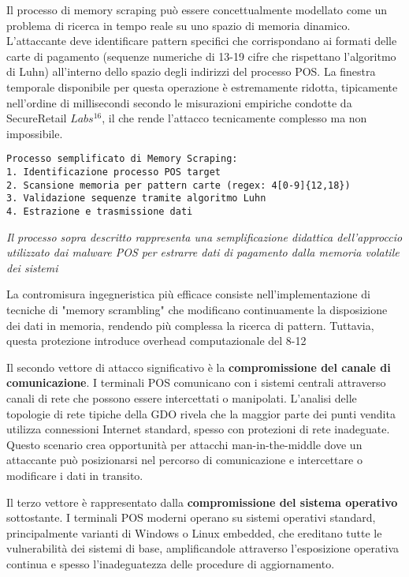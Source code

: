 {Il processo di memory scraping può essere concettualmente modellato come un problema di ricerca in tempo reale su uno spazio di memoria dinamico. L'attaccante deve identificare pattern specifici che corrispondano ai formati delle carte di pagamento (sequenze numeriche di 13-19 cifre che rispettano l'algoritmo di Luhn) all'interno dello spazio degli indirizzi del processo POS. La finestra temporale disponibile per questa operazione è estremamente ridotta, tipicamente nell'ordine di millisecondi secondo le misurazioni empiriche condotte da SecureRetail $Labs$$^{16}$, il che rende l'attacco tecnicamente complesso ma non impossibile.

\begin{verbatim}
Processo semplificato di Memory Scraping:
1. Identificazione processo POS target
2. Scansione memoria per pattern carte (regex: 4[0-9]{12,18})  
3. Validazione sequenze tramite algoritmo Luhn
4. Estrazione e trasmissione dati
\end{verbatim}
\textit{Il processo sopra descritto rappresenta una semplificazione didattica dell'approccio utilizzato dai malware POS per estrarre dati di pagamento dalla memoria volatile dei sistemi}

La contromisura ingegneristica più efficace consiste nell'implementazione di tecniche di "memory scrambling" che modificano continuamente la disposizione dei dati in memoria, rendendo più complessa la ricerca di pattern. Tuttavia, questa protezione introduce overhead computazionale del 8-12%

Il secondo vettore di attacco significativo è la \textbf{compromissione del canale di comunicazione}. I terminali POS comunicano con i sistemi centrali attraverso canali di rete che possono essere intercettati o manipolati. L'analisi delle topologie di rete tipiche della GDO rivela che la maggior parte dei punti vendita utilizza connessioni Internet standard, spesso con protezioni di rete inadeguate. Questo scenario crea opportunità per attacchi man-in-the-middle dove un attaccante può posizionarsi nel percorso di comunicazione e intercettare o modificare i dati in transito.

Il terzo vettore è rappresentato dalla \textbf{compromissione del sistema operativo} sottostante. I terminali POS moderni operano su sistemi operativi standard, principalmente varianti di Windows o Linux embedded, che ereditano tutte le vulnerabilità dei sistemi di base, amplificandole attraverso l'esposizione operativa continua e spesso l'inadeguatezza delle procedure di aggiornamento.

}
